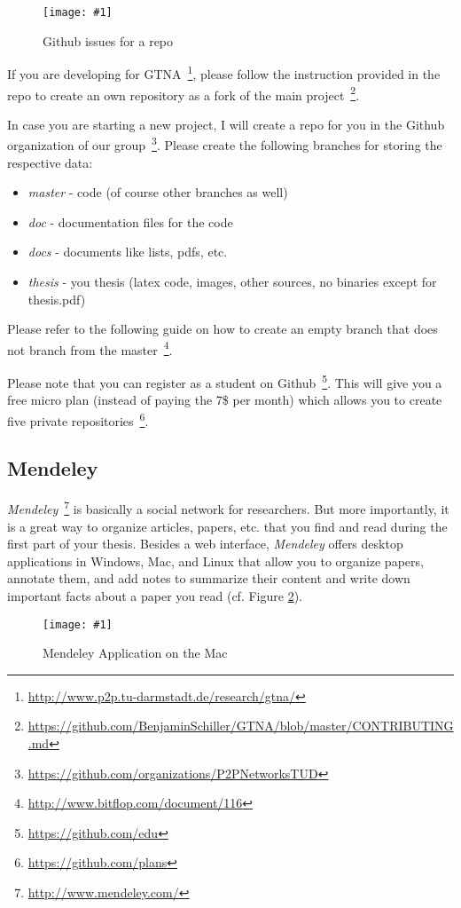 \documentclass{article}
\newcommand{\img}[4]{
	\begin{figure}[!htb]
		\centering
		\texttt{[image: \#1]}
		\caption{#3}
		\label{#2}
	\end{figure}
}
\begin{document}
\img{github}{fig:github}{Github issues for a repo}{0.6}

If you are developing for GTNA~\footnote{\url{http://www.p2p.tu-darmstadt.de/research/gtna/}}, please follow the instruction provided in the repo to create an own repository as a fork of the main project~\footnote{\url{https://github.com/BenjaminSchiller/GTNA/blob/master/CONTRIBUTING.md}}.

In case you are starting a new project, I will create a repo for you in the Github organization of our group~\footnote{\url{https://github.com/organizations/P2PNetworksTUD}}.
Please create the following branches for storing the respective data:
\begin{itemize}
	\item \emph{master} - code (of course other branches as well)
	\item \emph{doc} - documentation files for the code
	\item \emph{docs} - documents like lists, pdfs, etc.
	\item \emph{thesis} - you thesis (latex code, images, other sources, no binaries except for thesis.pdf)
\end{itemize}
Please refer to the following guide on how to create an empty branch that does not branch from the master~\footnote{\url{http://www.bitflop.com/document/116}}.

Please note that you can register as a student on Github~\footnote{\url{https://github.com/edu}}.
This will give you a free micro plan (instead of paying the 7\$ per month) which allows you to create five private repositories~\footnote{\url{https://github.com/plans}}.




\subsection{Mendeley}
\label{sec:mendeley}

\emph{Mendeley}~\footnote{\url{http://www.mendeley.com/}} is basically a social network for researchers.
But more importantly, it is a great way to organize articles, papers, etc. that you find and read during the first part of your thesis.
Besides a web interface, \emph{Mendeley} offers desktop applications in Windows, Mac, and Linux that allow you to organize papers, annotate them, and add notes to summarize their content and write down important facts about a paper you read (cf. Figure \ref{fig:mendeley}).

\img{mendeley}{fig:mendeley}{Mendeley Application on the Mac}{0.6}
\end{document}
